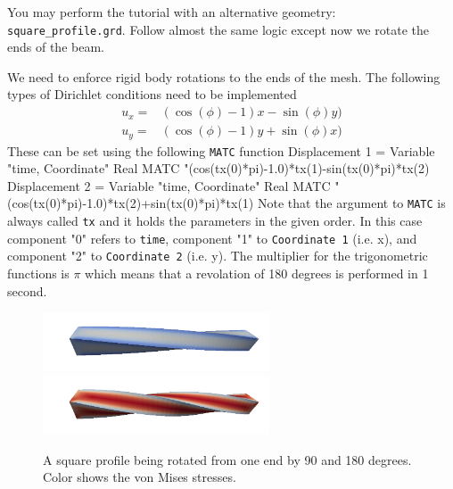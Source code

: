 You may perform the tutorial with an alternative geometry: \texttt{square\_profile.grd}.
Follow almost the same logic except now we rotate the ends of the beam.

We need to enforce rigid body rotations to the ends of the mesh. The following
types of Dirichlet conditions need to be implemented
\begin{equation}
  \begin{array}{ll}
    u_x = & ( \cos(\phi) - 1)x - \sin(\phi)y ) \\
    u_y = & ( \cos(\phi) - 1)y + \sin(\phi)x )     
  \end{array}
\end{equation}
These can be set using the following \texttt{MATC} function
\ttbegin
  Displacement 1 = Variable "time, Coordinate"
    Real MATC "(cos(tx(0)*pi)-1.0)*tx(1)-sin(tx(0)*pi)*tx(2)
  Displacement 2 = Variable "time, Coordinate"
    Real MATC "(cos(tx(0)*pi)-1.0)*tx(2)+sin(tx(0)*pi)*tx(1)
\ttend 
Note that the argument to \texttt{MATC} is always called \texttt{tx} and it holds the
parameters in the given order. In this case component "0" refers to \texttt{time}, component "1" to
\texttt{Coordinate 1} (i.e. x), and component "2" to \texttt{Coordinate 2} (i.e. y). 
The multiplier for the trigonometric functions is $\pi$ which means that a revolation of
180 degrees is performed in 1 second. 
 
\begin{figure}[h!]
\begin{center}
  \includegraphics[width=0.6\textwidth]{RotatingProfile50}
  \includegraphics[width=0.6\textwidth]{RotatingProfile100}
  \caption{A square profile being rotated from one end by 90 and 180 degrees. Color shows the von Mises stresses.}
  \label{fig:RotatingProfile}
\end{center}
\end{figure}



\vfill
\mbox{}
